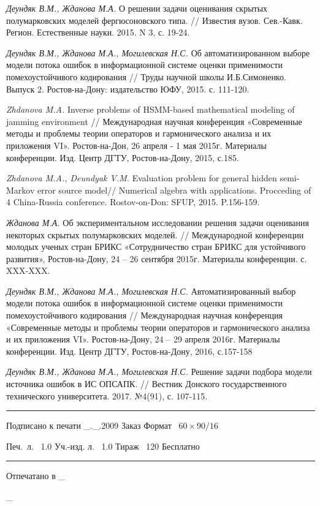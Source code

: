 \documentclass[twoside,12pt]{article}
\begin{document}
\begin{thebibliography}{99}
\emph{Деундяк В.М., Жданова М.А.} О решении задачи оценивания скрытых полумарковских моделей фергюсоновского типа. // Известия вузов. Сев.-Кавк. Регион. Естественные науки. 2015. N 3,  с. 19-24.

\emph{Деундяк В.М., Жданова М.А., Могилевская Н.С.} Об автоматизированном выборе модели потока ошибок в информационной системе оценки применимости помехоустойчивого кодирования // Труды научной школы И.Б.Симоненко. Выпуск 2. Ростов-на-Дону: издательство ЮФУ, 2015.  с. 111-120.

\emph{Zhdanova M.A.} Inverse problems of HSMM-based mathematical modeling of jamming environment // Международная научная конференция «Современные методы и проблемы теории операторов и гармонического анализа и их приложения VI». Ростов-на-Дон, 26 апреля - 1 мая 2015г.  Материалы конференции. Изд. Центр ДГТУ, Ростов-на-Дону, 2015, с.185.

\emph{Zhdanova M.A., Deundyak V.M.} Evaluation problem for general hidden semi-Markov error source model// Numerical algebra with applications. Procceding of 4 China-Russia conference. Rostov-on-Don: SFUP, 2015. P.156-159.

\emph{Жданова М.А.} Об экспериментальном исследовании решения задачи оценивания некоторых скрытых полумарковских моделей. // Международной конференции молодых ученых стран БРИКС
«Сотрудничество стран БРИКС для устойчивого развития», Ростов-на-Дону, 24 – 26 сентября 2015г.  Материалы конференции.  с. XXX-XXX.

\emph{Деундяк В.М., Жданова М.А., Могилевская Н.С.} Автоматизированный выбор модели потока ошибок в информационной системе оценки применимости помехоустойчивого кодирования // Международная научная конференция «Современные методы и проблемы теории операторов и гармонического анализа и их приложения VI». Ростов-на-Дону, 24 – 29 апреля 2016г.  Материалы конференции. Изд. Центр ДГТУ, Ростов-на-Дону, 2016, с.157-158

\emph{Деундяк В.М., Жданова М.А., Могилевская Н.С.} Решение задачи подбора модели источника ошибок в ИС ОПСАПК. // Вестник Донского государственного технического университета. 2017. №4(91), с. 107-115.

\end{thebibliography}


\thispagestyle{empty}
\vfill
\footnotesize
\hrule
\medskip\noindent
Подписано к печати \_.\_.2009 \hskip 10mm
Заказ \hskip 28mm
Формат \ $60\times90/16$

\medskip\noindent
Печ.~л. \ 1.0 \hskip 16mm
Уч.-изд. л. \ 1.0 \hskip 16mm
Тираж \ 120 \hskip 16mm
Бесплатно
\medskip\hrule

\medskip\noindent
Отпечатано в \_

\medskip\noindent
\_
\end{document}
